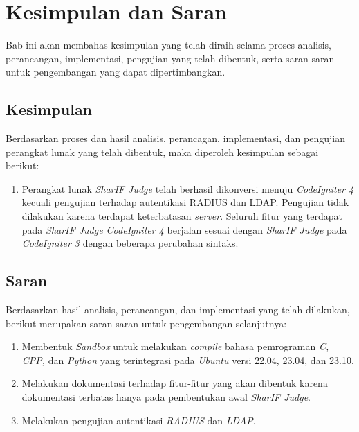 \chapter{Kesimpulan dan Saran}
\label{chap:kesimpulandansaran}
Bab ini akan membahas kesimpulan yang telah diraih selama proses analisis, perancangan, implementasi, pengujian yang telah dibentuk, serta saran-saran untuk pengembangan yang dapat dipertimbangkan.
\section{Kesimpulan}
Berdasarkan proses dan hasil analisis, perancagan, implementasi, dan pengujian perangkat lunak yang telah dibentuk, maka diperoleh kesimpulan sebagai berikut:
\begin{enumerate}
	\item Perangkat lunak \textit{SharIF Judge} telah berhasil dikonversi menuju \textit{CodeIgniter 4} kecuali pengujian terhadap autentikasi RADIUS dan LDAP. Pengujian tidak dilakukan karena terdapat keterbatasan \textit{server}. Seluruh fitur yang terdapat pada \textit{SharIF Judge CodeIgniter 4} berjalan sesuai dengan \textit{SharIF Judge} pada \textit{CodeIgniter 3} dengan beberapa perubahan sintaks.
\end{enumerate}

\section{Saran}
Berdasarkan hasil analisis, perancangan, dan implementasi yang telah dilakukan, berikut merupakan saran-saran untuk pengembangan selanjutnya:
\begin{enumerate}
	\item Membentuk \textit{Sandbox} untuk melakukan \textit{compile} bahasa pemrograman \textit{C, CPP,} dan \textit{Python} yang terintegrasi pada \textit{Ubuntu} versi 22.04, 23.04, dan 23.10.
	\item Melakukan dokumentasi terhadap fitur-fitur yang akan dibentuk karena dokumentasi terbatas hanya pada pembentukan awal \textit{SharIF Judge}.
	\item Melakukan pengujian autentikasi \textit{RADIUS} dan \textit{LDAP}.
\end{enumerate}
